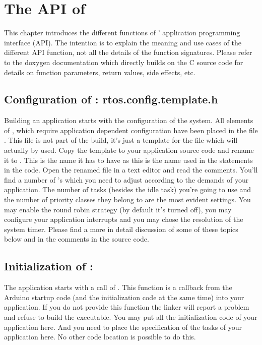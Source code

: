 \chapter{The API of \rtos}
\label{secAPI}

This chapter introduces the different functions of \rtos' application
programming interface (API). The intention is to explain the meaning and
use cases of the different API function, not all the details of the
function signatures. Please refer to the doxygen documentation which
directly builds on the C source code for details on function parameters,
return values, side effects, etc.


\section{Configuration of \rtos: rtos.config.template.h}

Building an \rtos{} application starts with the configuration of the
system. All elements of \rtos{}, which require application dependent
configuration have been placed in the file .
This file is not part of the build, it's just a template for the file which
will actually by used. Copy the template to your application source code
and rename it to . This is the name it has to have as
this is the name used in the  statements in the code.
Open the renamed file in a text editor and read the comments. You'll find
a number of 's which you need to adjust according to the
demands of your application. The number of tasks (besides the idle task)
you're going to use and the number of priority classes they belong to are
the most evident settings. You may enable the round robin strategy (by
default it's turned off), you may configure your application interrupts
and you may chose the resolution of the system timer. Please find a more
in detail discussion of some of these topics below and in the comments in
the source code.

\section{Initialization of \rtos: }

The \rtos{} application starts with a call of . This function
is a callback from the Arduino startup code (and the \rtos{} initialization
code at the same time) into your application. If you do not provide this
function the linker will report a problem and refuse to build the
executable. You may put all the initialization code of your application
here. And you need to place the specification of the tasks of your
application here. No other code location is possible to do this.


